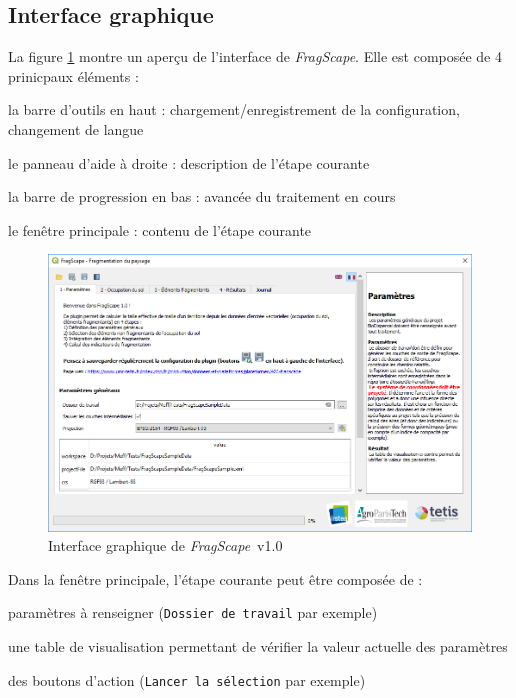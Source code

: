 \documentclass[11pt]{article}
\newcommand{\source}[1]{\vspace*{-0.4cm}\caption*{\textit{Source: {#1}}}}
\newcommand{\tool}{\emph{FragScape}}
\let\tempone\itemize
\let\temptwo\enditemize
\renewenvironment{itemize}{\tempone\addtolength{\itemsep}{-0.5\baselineskip}}{\temptwo}
\begin{document}
\subsection{Interface graphique}

La figure \ref{fig:paramsTab} montre un aperçu de l'interface de \tool. Elle est composée de 4 prinicpaux éléments :
\begin{itemize}
    \item la barre d'outils en haut : chargement/enregistrement de la configuration, changement de langue 
    \item le panneau d'aide à droite : description de l'étape courante
    \item la barre de progression en bas : avancée du traitement en cours
    \item le fenêtre principale : contenu de l'étape courante
\end{itemize}

\begin{figure}[h!]
    \centering
    \includegraphics[scale=0.7]{pictures/paramsTabFr.png}
    \caption{Interface graphique de \tool\ v1.0}
    \label{fig:paramsTab}
\end{figure}

Dans la fenêtre principale, l'étape courante peut être composée de :
\begin{itemize}
    \item paramètres à renseigner (\texttt{Dossier de travail} par exemple)
    \item une table de visualisation permettant de vérifier la valeur actuelle des paramètres
    \item des boutons d'action (\texttt{Lancer la sélection} par exemple)
\end{itemize}
\end{document}
